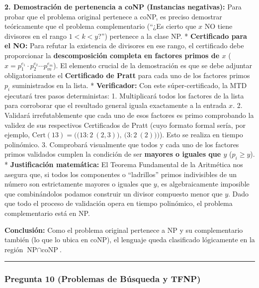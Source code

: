 \documentclass[12pt]{book} %
\begin{document}
\textbf{2. Demostración de pertenencia a coNP (Instancias negativas):}
Para probar que el problema original pertenece a coNP, es preciso
demostrar teóricamente que el problema complementario (``¿Es cierto que
\(x\) NO tiene divisores en el rango \(1 < k < y\)?'') pertenece a la
clase NP. * \textbf{Certificado para el NO:} Para refutar la existencia
de divisores en ese rango, el certificado debe proporcionar la
\textbf{descomposición completa en factores primos de \(x\)}
(\(x = p_1^{e_1} \cdot p_2^{e_2} \cdots p_m^{e_m}\)). El elemento
crucial de la demostración es que se debe adjuntar obligatoriamente el
\textbf{Certificado de Pratt} para cada uno de los factores primos
\(p_i\) suministrados en la lista. * \textbf{Verificador:} Con este
súper-certificado, la MTD ejecutará tres pasos deterministas: 1.
Multiplicará todos los factores de la lista para corroborar que el
resultado general iguala exactamente a la entrada \(x\). 2. Validará
irrefutablemente que cada uno de esos factores es primo comprobando la
validez de sus respectivos Certificados de Pratt (cuyo formato formal
sería, por ejemplo,
\(\text{Cert}(13) = \Big( \big(13 : 2 \ (2, 3)\big), \ \big(3 : 2 \ (2)\big) \Big)\)).
Esto se realiza en tiempo polinómico. 3. Comprobará visualmente que
todos y cada uno de los factores primos validados cumplen la condición
de ser \textbf{mayores o iguales que \(y\)} (\(p_i \ge y\)). *
\textbf{Justificación matemática:} El Teorema Fundamental de la
Aritmética nos asegura que, si todos los componentes o ``ladrillos''
primos indivisibles de un número son estrictamente mayores o iguales que
\(y\), es algebraicamente imposible que combinándolos podamos construir
un divisor compuesto menor que \(y\). Dado que todo el proceso de
validación opera en tiempo polinómico, el problema complementario está
en NP.

\textbf{Conclusión:} Como el problema original pertenece a NP y su
complementario también (lo que lo ubica en coNP), el lenguaje queda
clasificado lógicamente en la región
\textbf{\(\text{NP} \cap \text{coNP}\)}.

\begin{center}\rule{0.5\linewidth}{0.5pt}\end{center}

\hypertarget{pregunta-10-problemas-de-buxfasqueda-y-tfnp}{%
\subsubsection{Pregunta 10 (Problemas de Búsqueda y
TFNP)}\label{pregunta-10-problemas-de-buxfasqueda-y-tfnp}}
\end{document}
